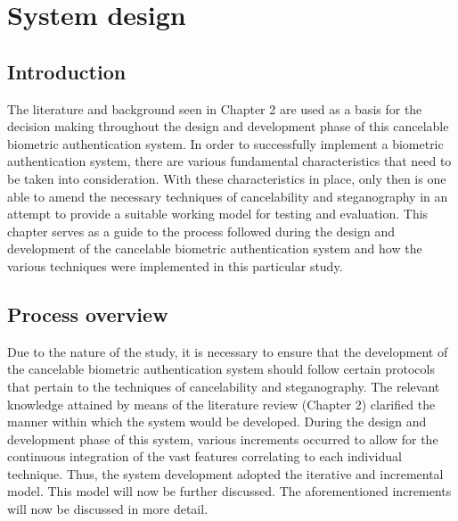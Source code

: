 \chapter{System design}

\ifpdf
    \graphicspath{{Chapter3/Figs/Raster/}{Chapter3/Figs/PDF/}{Chapter3/Figs/}}
\else
    \graphicspath{{Chapter3/Figs/Vector/}{Chapter3/Figs/}}
\fi

\section{Introduction}

The literature and background seen in Chapter 2 are used as a basis for the decision making throughout the design and development phase of this cancelable biometric authentication system. 
In order to successfully implement a biometric authentication system, there are various fundamental characteristics that need to be taken into consideration. With these characteristics in place, only then is one able to amend the necessary techniques of cancelability and steganography in an attempt to provide a suitable working model for testing and evaluation. 
This chapter serves as a guide to the process followed during the design and development of the cancelable biometric authentication system and how the various techniques were implemented in this particular study.


\section{Process overview}

Due to the nature of the study, it is necessary to ensure that the development of the cancelable biometric authentication system should follow certain protocols that pertain to the techniques of cancelability and steganography. The relevant knowledge attained by means of the literature review (Chapter 2) clarified the manner within which the system would be developed. During the design and development phase of this system, various increments occurred to allow for the continuous integration of the vast features correlating to each individual technique. Thus, the system development adopted the iterative and incremental model. This model will now be further discussed. The aforementioned increments will now be discussed in more detail.

